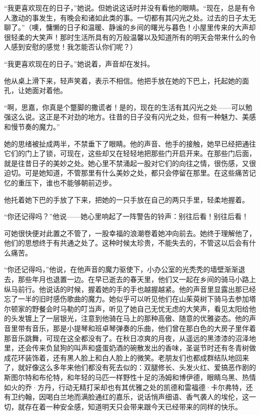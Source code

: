 \par “我更喜欢现在的日子，”她说。但她说这话时并没有看他的眼睛。“现在，总是有令人激动的事发生，有晚会和诸如此类的事。一切都有其闪光之处。过去的日子太无聊了。”（噢，慵懒的日子和温暖、静谧的乡间的曙光与暮色！小屋里传来的大声却很轻柔的大笑声！那时生活所具有的万般温馨以及知道所有的明天会带来什么的令人感到安慰的感觉！我怎能否认你们呢？）
\par “我更喜欢现在的日子。”她说着，声音却在发抖。
\par 他从桌上滑下来，轻声笑着，表示不相信。他把手放在她的下巴上，托起她的面孔，让她面对着他。
\par “啊，思嘉，你真是个蹩脚的撒谎者！是的，现在的生活有其闪光之处——可以勉强这么说。这正是不对劲的地方。往昔的日子没有闪光之处，但有一种魅力、美感和慢节奏的魔力。”
\par 她的思绪被扯成两半，不禁垂下了眼睛。他的声音、他手的接触，她早已经把通往它们的门上了锁，可现在，这些却又在轻轻地把那些门开启开来。在那些门后面，就是往昔日子的美妙之处。她心里不禁涌起一股对它们的向往之情，很伤感，又很迫切。可是她知道，不管那里有什么美妙之处，都只会停留在那里。在这些痛苦记忆的重压下，谁也不能够朝前迈步。
\par 他托着她下巴的手放了下来，把她的一只手放在自己的两只手里，轻柔地握着。
\par “你还记得吗？”他说——她心里响起了一阵警告的铃声：别往后看！别往后看！
\par 可她很快便对此置之不管了，一股幸福的浪潮卷着她冲向前去。她终于理解他了，他们的思想终于有共通之处了。这种时候太珍贵，不能失去的，不管这以后会有什么痛苦。
\par “你还记得吗，”他说，在他声音的魔力驱使下，小办公室的光秃秃的墙壁渐渐退去，那些年月也退置一边。在早已逝去的春天里，他们又一起在乡间的骑马小路上纵马前行。他说话的时候，握着她的手的手也越握越紧。他的声音里显露出那已经忘了一半的旧时感伤歌曲的魔力。她似乎可以听见他们在山茱萸树下骑马去参加塔尔顿家的野餐会时马勒的叮当声，听见了她自己无忧无虑的大笑声，看见太阳给他的头发镀上了一层银光，注意到他骑在马上的那种高傲、随意的优雅姿态。他的声音里带有音乐，那是小提琴和班卓琴弹奏的乐曲，他们曾在那白色的大房子里伴着那音乐跳舞，可现在这全都没有了。在秋日凉爽的月夜，从遥远的黑漆漆的沼泽地里，还会传来负鼠狗的叫声和盛蛋奶酒的碗散发出的香味，圣诞节时还有冬青树做成花环装饰着，还有黑人脸上和白人脸上的微笑。老朋友们也都成群结队地回来了，就好像这么多年来他们都没有死去似的：双腿修长、头发火红、爱搞恶作剧的斯图尔特和布伦特，和年轻的马匹一样野性十足的汤姆和博伊德，眼睛乌黑、热情如火的乔·方丹，行动无精打采却也有其优雅之处的凯德和雷福德·卡尔弗特，还有卫约翰，因喝白兰地而满脸通红的嘉乐，说话悄声细语、香气袭人的埃伦，这一切，就存在着一种安全感，知道明天只会带来跟今天已经带来的同样的快乐。
